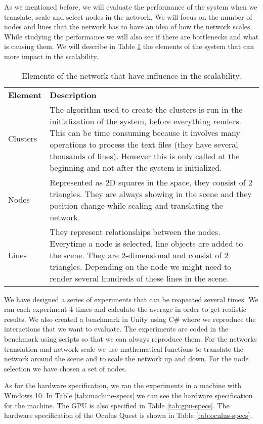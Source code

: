 As we mentioned before, we will evaluate the performance of the system when we translate, scale and select nodes in the network. We will focus on the number of nodes and lines that the network has to have an idea of how the network scales. While studying the performance we will also see if there are bottlenecks and what is causing them. We will describe in Table \ref{tab:network-elements} the elements of the system that can more impact in the scalability.

\begin{table}[h!]
\centering
\begin{tabular}{l p{9cm}}
\textbf{Element} & \textbf{Description} \\
Clusters & The algorithm used to create the clusters is run in the initialization of the system, before everything renders. This can be time consuming because it involves many operations to process the text files (they have several thousands of lines). However this is only called at the beginning and not after the system is initialized. \\
Nodes   & Represented as 2D squares in the space, they consist of 2 triangles. They are always showing in the scene and they position change while scaling and translating the network.  \\
Lines & They represent relationships between the nodes. Everytime a node is selected, line objects are added to the scene. They are 2-dimensional and consist of 2 triangles. Depending on the node we might need to render several hundreds of these lines in the scene. \\
\end{tabular}
\caption{Elements of the network that have influence in the scalability.}
\label{tab:network-elements}
\end{table}

We have designed a series of experiments that can be reapeated several times. We ran each experiment 4 times and calculate the average in order to get realistic results. We also created a benchmark in Unity using C\# where we reproduce the interactions that we want to evaluate. The experiments are coded in the benchmark using scripts so that we can always reproduce them. For the networks translation and network scale we use mathematical functions to translate the network around the scene and to scale the network up and down. For the node selection we have chosen a set of nodes.

As for the hardware specification, we ran the experiments in a machine with Windows 10. In Table \ref{tab:machine-specs} we can see the hardware specification for the machine. The GPU is also specified in Table \ref{tab:gpu-specs}. The hardware specification of the Oculus Quest is shown in Table \ref{tab:oculus-specs}.

